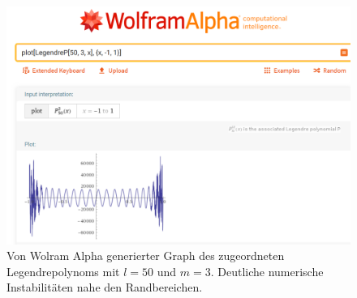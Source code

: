 \begin{figure}[!ht]
\centering
\includegraphics[width=0.9\linewidth]{papers/legendre/plots/wolframalpha}
\caption{Von Wolram Alpha \cite{legendre:wolfram-alpha} generierter Graph des zugeordneten Legendrepolynoms mit \texorpdfstring{$l=50$}{l=50} und \texorpdfstring{$m=3$}{m=3}. Deutliche numerische Instabilitäten nahe den Randbereichen.}
\label{legendre:fig:wolframalpha}
\end{figure}
